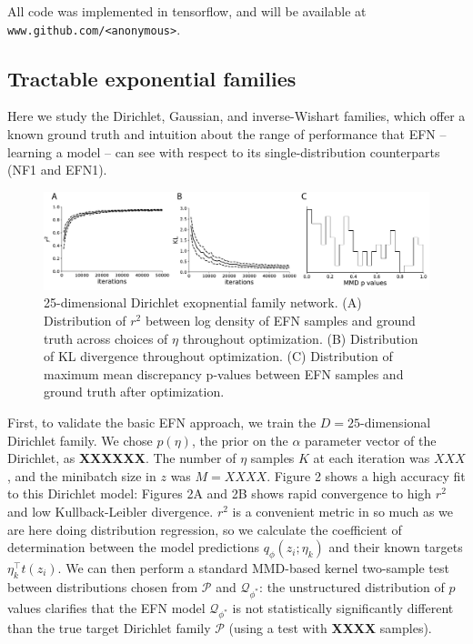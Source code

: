 \documentclass{article}
\begin{document}
All code was implemented in tensorflow, and will be available at {\tt www.github.com/<anonymous>}.

\subsection{Tractable exponential families}

Here we study the Dirichlet, Gaussian, and inverse-Wishart families, which offer a known ground truth and intuition about the range of performance that EFN -- learning a model -- can see with respect to its single-distribution counterparts (NF1 and EFN1).  


 \begin{figure}
  \centering
\includegraphics[scale=0.46]{figs/fig2/fig2.pdf}
  \caption{25-dimensional Dirichlet exopnential family network.  (A) Distribution of $r^2$ between log density of EFN samples and ground truth across choices of $\eta$ throughout optimization.  (B) Distribution of KL divergence throughout optimization.  (C) Distribution of maximum mean discrepancy p-values between EFN samples and ground truth after optimization.}
\end{figure}

First, to validate the basic EFN approach, we train the $D=25$-dimensional Dirichlet family.  We chose $p(\eta)$, the prior on the $\alpha$ parameter vector of the Dirichlet, as {\bf XXXXXX}.  The number of $\eta$ samples $K$ at each iteration was $XXX$, and the minibatch size in $z$ was $M=XXXX$.   Figure 2 shows a high accuracy fit to this Dirichlet model: Figures 2A and 2B shows rapid convergence to high $r^2$ and low Kullback-Leibler divergence.  $r^2$ is a convenient metric in so much as we are here doing distribution regression, so we calculate the coefficient of determination between the model predictions $q_\phi(z_i; \eta_k)$ and their known targets $\eta_k^\top t(z_i)$.  We can then perform a standard MMD-based kernel two-sample test \cite{gretton2012kernel} between distributions chosen from $\mathcal{P}$ and $\mathcal{Q}_{\phi^*}$: the unstructured distribution of $p$ values clarifies that the EFN model $\mathcal{Q}_{\phi^*}$  is not statistically significantly different than the true target Dirichlet family $\mathcal{P}$ (using a test with {\bf XXXX} samples).
\end{document}
